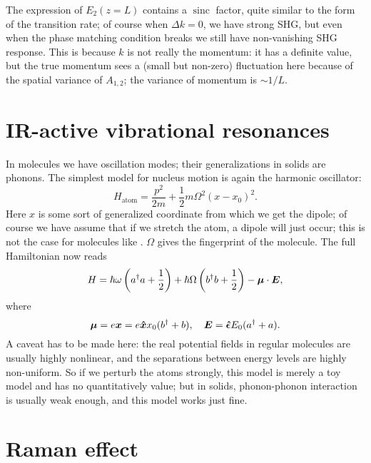 \documentclass[hyperref, a4paper]{article}
\DeclareMathOperator{\sinc}{sinc}
\begin{document}
The expression of $E_2(z = L)$ contains a $\sinc$ factor, 
quite similar to the form of the transition rate; 
of course when $\Delta k = 0$, 
we have strong SHG, 
but even when the phase matching condition breaks 
we still have non-vanishing SHG response. 
This is because $k$ is not really the momentum:
it has a definite value, 
but the true momentum sees a (small but non-zero) fluctuation here 
because of the spatial variance of $A_{1, 2}$; 
the variance of momentum is $\sim 1 / L$.

\section{IR-active vibrational resonances}

In molecules we have oscillation modes; 
their generalizations in solids are phonons.
The simplest model for nucleus motion is again the harmonic oscillator:
\begin{equation}
    H_{\text{atom}} = \frac{p^2}{2m} + \frac{1}{2} m \Omega^2 (x - x_0)^2. 
\end{equation}
Here $x$ is some sort of generalized coordinate
from which we get the dipole; 
of course we have assume that if we stretch the atom, 
a dipole will just occur;
this is not the case for molecules like .
$\Omega$ gives the fingerprint of the molecule.
The full Hamiltonian now reads 
\begin{equation}
    H = \hbar \omega \left(
        a^\dagger a + \frac{1}{2}
    \right) + 
    \hbar \Omega \left(
        b^\dagger b + \frac{1}{2}
    \right) - \vb*{\mu} \cdot \vb*{E}, 
\end{equation}
where 
\begin{equation}
    \vb*{\mu} = e \vb*{x} = e \vu*{x} x_0 (b^\dagger + b), \quad 
    \vb*{E} = \vu*{\epsilon} E_0 (a^\dagger + a).
\end{equation}
A caveat has to be made here: 
the real potential fields in regular molecules 
are usually highly nonlinear, 
and the separations between energy levels are highly non-uniform.
So if we perturb the atoms strongly, 
this model is merely a toy model and has no quantitatively value; 
but in solids, phonon-phonon interaction is usually weak enough, 
and this model works just fine.

\section{Raman effect}
\end{document}
